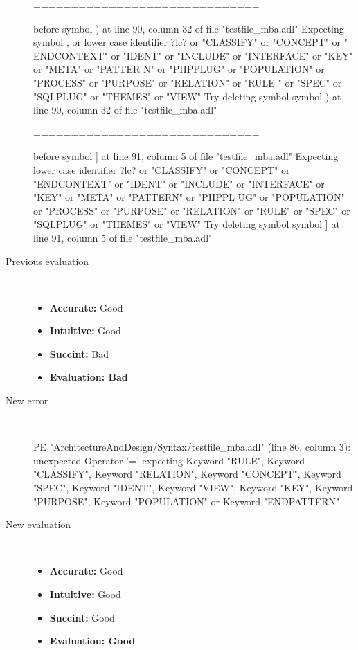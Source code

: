 \begin{description}
\begin{haskell}
==============================

before symbol ) at line 90, column 32 of file "testfile_mba.adl"
Expecting symbol , or lower case identifier ?lc? or "CLASSIFY" or "CONCEPT" or "
ENDCONTEXT" or "IDENT" or "INCLUDE" or "INTERFACE" or "KEY" or "META" or "PATTER
N" or "PHPPLUG" or "POPULATION" or "PROCESS" or "PURPOSE" or "RELATION" or "RULE
" or "SPEC" or "SQLPLUG" or "THEMES" or "VIEW"
Try deleting symbol symbol ) at line 90, column 32 of file "testfile_mba.adl"

==============================

before symbol ] at line 91, column 5 of file "testfile_mba.adl"
Expecting lower case identifier ?lc? or "CLASSIFY" or "CONCEPT" or "ENDCONTEXT"
or "IDENT" or "INCLUDE" or "INTERFACE" or "KEY" or "META" or "PATTERN" or "PHPPL
UG" or "POPULATION" or "PROCESS" or "PURPOSE" or "RELATION" or "RULE" or "SPEC"
or "SQLPLUG" or "THEMES" or "VIEW"
Try deleting symbol symbol ] at line 91, column 5 of file "testfile_mba.adl"
\end{haskell}
  \item[Previous evaluation]~\\
    \begin{itemize}
    \item \textbf{Accurate:} Good
    \item \textbf{Intuitive:} Good
    \item \textbf{Succint:} Bad
    \item \textbf{Evaluation: Bad}
    \end{itemize}
  \item[New error]~\\
\begin{haskell}
PE "ArchitectureAndDesign/Syntax/testfile_mba.adl" (line 86, column 3):
unexpected Operator '='
expecting Keyword "RULE", Keyword "CLASSIFY", Keyword "RELATION", Keyword "CONCEPT", Keyword "SPEC", Keyword "IDENT", Keyword "VIEW", Keyword "KEY", Keyword "PURPOSE", Keyword "POPULATION" or Keyword "ENDPATTERN"\end{haskell}
  \item[New evaluation]~\\
    \begin{itemize}
    \item \textbf{Accurate:} Good
    \item \textbf{Intuitive:} Good
    \item \textbf{Succint:} Good
    \item \textbf{Evaluation: Good
}
    \end{itemize}
  \end{description}

